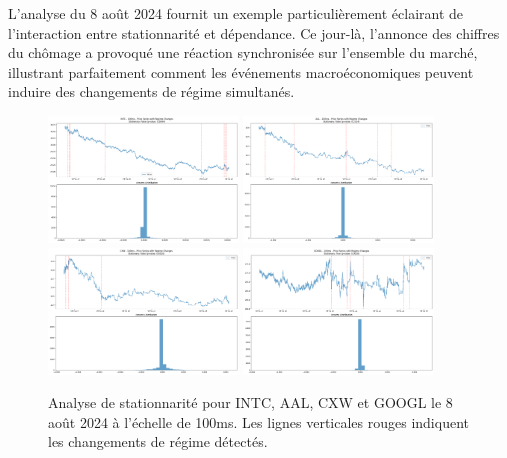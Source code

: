 \documentclass[12pt,a4paper]{article}
\theoremstyle{definition}
\theoremstyle{remark}
\begin{document}
L'analyse du 8 août 2024 fournit un exemple particulièrement éclairant de l'interaction entre stationnarité et dépendance. Ce jour-là, l'annonce des chiffres du chômage a provoqué une réaction synchronisée sur l'ensemble du marché, illustrant parfaitement comment les événements macroéconomiques peuvent induire des changements de régime simultanés.

\begin{figure}[h!]
    \centering
    \includegraphics[width=0.45\textwidth]{results/stationarity/stats/INTC/INTC_2024-08-01_100ms.png}
    \includegraphics[width=0.45\textwidth]{results/stationarity/stats/AAL/AAL_2024-08-01_100ms.png}
    \includegraphics[width=0.45\textwidth]{results/stationarity/stats/CXW/CXW_2024-08-01_100ms.png}
    \includegraphics[width=0.45\textwidth]{results/stationarity/stats/GOOGL/GOOGL_2024-08-01_100ms.png}
    \caption{Analyse de stationnarité pour INTC, AAL, CXW et GOOGL le 8 août 2024 à l'échelle de 100ms. Les lignes verticales rouges indiquent les changements de régime détectés.}
    \label{fig:stationarity_unemployment}
\end{figure}
\end{document}
